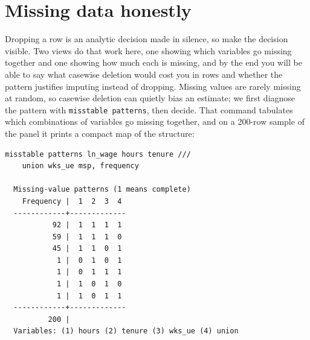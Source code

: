 \documentclass[
    a4paper,
    fontsize=10pt,
    twoside=true,
    numbers=noenddot,
]{kaobook}
\begin{document}
\section{Missing data honestly}
Dropping a row is an analytic decision made in silence, so make the decision visible. Two views do that work here, one showing which variables go missing together and one showing how much each is missing, and by the end you will be able to say what casewise deletion would cost you in rows and whether the pattern justifies imputing instead of dropping. Missing values are rarely missing at random, so casewise deletion can quietly bias an estimate; we first diagnose the pattern with \texttt{misstable patterns}, then decide. That command tabulates which combinations of variables go missing together, and on a 200-row sample of the panel it prints a compact map of the structure:
\par
{\footnotesize
\begin{verbatim}
misstable patterns ln_wage hours tenure ///
    union wks_ue msp, frequency

  Missing-value patterns (1 means complete)
    Frequency |  1  2  3  4
  ------------+-------------
           92 |  1  1  1  1
           59 |  1  1  1  0
           45 |  1  1  0  1
            1 |  0  1  0  1
            1 |  0  1  1  1
            1 |  1  0  1  0
            1 |  1  0  1  1
  ------------+-------------
          200 |
  Variables: (1) hours (2) tenure (3) wks_ue (4) union
\end{verbatim}
}
\end{document}
